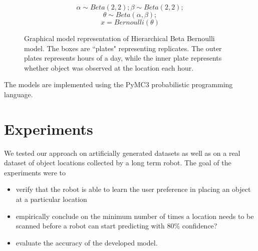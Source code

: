 \noindent
\begin{figure}[htp]

\begin{minipage}{0.3\textwidth}
\centering


\end{minipage}%
\begin{minipage}{0.7\textwidth}

\begin{equation*}
	\alpha \sim Beta (2,2) ; \beta \sim Beta (2, 2);
\end{equation*}
\begin{equation*}
	\theta \sim Beta (\alpha, \beta);
\end{equation*}
\begin{equation*}
	x = Bernoulli (\theta)
\end{equation*}
\end{minipage}
\caption[Hierarchical Beta Bernoulli graphical model]{Graphical model representation of Hierarchical Beta Bernoulli model. The boxes are ``plates" representing replicates. The outer plates represents hours of a day, while the inner plate represents whether object was observed at the location each hour.}
\label{bbm}
\end{figure}

The models are implemented using the PyMC3 probabilistic programming language.

\FloatBarrier
\section{Experiments}

We tested our approach on artificially generated datasets as well as on a real dataset of object locations collected by a long term robot.
The goal of the experiments were to
\begin{itemize}
    \item verify that the robot is able to learn the user preference in placing an object at a particular location
	\item empirically conclude on the minimum number of times a location needs to be scanned before a robot can start predicting with 80\% confidence?
	\item evaluate the accuracy of the developed model.
\end{itemize}

